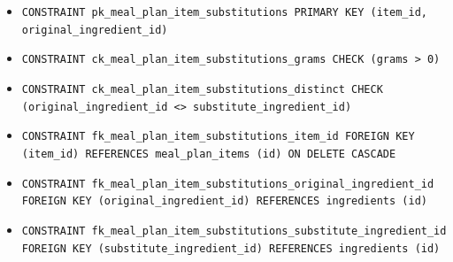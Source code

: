 \begin{itemize}
\item \raggedright {\small\texttt{CONSTRAINT pk\_\allowbreak{}\allowbreak{}meal\_\allowbreak{}\allowbreak{}plan\_\allowbreak{}\allowbreak{}item\_\allowbreak{}\allowbreak{}substitutions PRIMARY KEY (item\_\allowbreak{}\allowbreak{}id, original\_\allowbreak{}\allowbreak{}ingredient\_\allowbreak{}\allowbreak{}id)}}
\item \raggedright {\small\texttt{CONSTRAINT ck\_\allowbreak{}\allowbreak{}meal\_\allowbreak{}\allowbreak{}plan\_\allowbreak{}\allowbreak{}item\_\allowbreak{}\allowbreak{}substitutions\_\allowbreak{}\allowbreak{}grams CHECK (grams > 0)}}
\item \raggedright {\small\texttt{CONSTRAINT ck\_\allowbreak{}\allowbreak{}meal\_\allowbreak{}\allowbreak{}plan\_\allowbreak{}\allowbreak{}item\_\allowbreak{}\allowbreak{}substitutions\_\allowbreak{}\allowbreak{}distinct CHECK (original\_\allowbreak{}\allowbreak{}ingredient\_\allowbreak{}\allowbreak{}id <> substitute\_\allowbreak{}\allowbreak{}ingredient\_\allowbreak{}\allowbreak{}id)}}
\item \raggedright {\small\texttt{CONSTRAINT fk\_\allowbreak{}\allowbreak{}meal\_\allowbreak{}\allowbreak{}plan\_\allowbreak{}\allowbreak{}item\_\allowbreak{}\allowbreak{}substitutions\_\allowbreak{}\allowbreak{}item\_\allowbreak{}\allowbreak{}id FOREIGN KEY (item\_\allowbreak{}\allowbreak{}id) REFERENCES meal\_\allowbreak{}\allowbreak{}plan\_\allowbreak{}\allowbreak{}items (id) ON DELETE CASCADE}}
\item \raggedright {\small\texttt{CONSTRAINT fk\_\allowbreak{}\allowbreak{}meal\_\allowbreak{}\allowbreak{}plan\_\allowbreak{}\allowbreak{}item\_\allowbreak{}\allowbreak{}substitutions\_\allowbreak{}\allowbreak{}original\_\allowbreak{}\allowbreak{}ingredient\_\allowbreak{}\allowbreak{}id FOREIGN KEY (original\_\allowbreak{}\allowbreak{}ingredient\_\allowbreak{}\allowbreak{}id) REFERENCES ingredients (id)}}
\item \raggedright {\small\texttt{CONSTRAINT fk\_\allowbreak{}\allowbreak{}meal\_\allowbreak{}\allowbreak{}plan\_\allowbreak{}\allowbreak{}item\_\allowbreak{}\allowbreak{}substitutions\_\allowbreak{}\allowbreak{}substitute\_\allowbreak{}\allowbreak{}ingredient\_\allowbreak{}\allowbreak{}id FOREIGN KEY (substitute\_\allowbreak{}\allowbreak{}ingredient\_\allowbreak{}\allowbreak{}id) REFERENCES ingredients (id)}}
\end{itemize}
